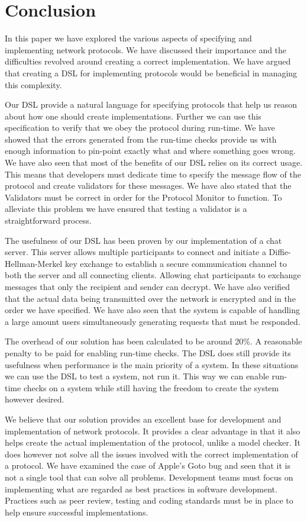 \section{Conclusion}
In this paper we have explored the various aspects of specifying and implementing network protocols. We have discussed their importance and the difficulties revolved around creating a correct implementation. We have argued that creating a DSL for implementing protocols would be beneficial in managing this complexity.

Our DSL provide a natural language for specifying protocols that help us reason about how one should create implementations. Further we can use this specification to verify that we obey the protocol during run-time. We have showed that the errors generated from the run-time checks provide us with enough information to pin-point exactly what and where something goes wrong. We have also seen that most of the benefits of our DSL relies on its correct usage. This means that developers must dedicate time to specify the message flow of the protocol and create validators for these messages. We have also stated that the Validators must be correct in order for the Protocol Monitor to function. To alleviate this problem we have ensured that testing a validator is a straightforward process.

The usefulness of our DSL has been proven by our implementation of a chat server. This server allows multiple participants to connect and initiate a Diffie-Hellman-Merkel key exchange to establish a secure communication channel to both the server and all connecting clients. Allowing chat participants to exchange messages that only the recipient and sender can decrypt. We have also verified that the actual data being transmitted over the network is encrypted and in the order we have specified. We have also seen that the system is capable of handling a large amount users simultaneously generating requests that must be responded.

The overhead of our solution has been calculated to be around 20\%. A reasonable penalty to be paid for enabling run-time checks. The DSL does still provide its usefulness when performance is the main priority of a system. In these situations we can use the DSL to test a system, not run it. This way we can enable run-time checks on a system while still having the freedom to create the system however desired.

We believe that our solution provides an excellent base for development and implementation of network protocols. It provides a clear advantage in that it also helps create the actual implementation of the protocol, unlike a model checker. It does however not solve all the issues involved with the correct implementation of a protocol. We have examined the case of Apple's Goto bug and seen that it is not a single tool that can solve all problems. Development teams must focus on implementing what are regarded as best practices in software development. Practices such as peer review, testing and coding standards must be in place to help ensure successful implementations. 



